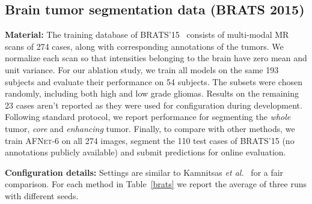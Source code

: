 \documentclass{llncs}
\newcommand{\afn}{\textsc{AFNet}}
\begin{document}
\vspace{-3mm}
\subsection{Brain tumor segmentation data (BRATS 2015) }
\label{subsec:brats_data}
\vspace{-1mm}
\textbf{Material:} The training database of BRATS'15~\cite{menze2015multimodal} consists of multi-modal MR scans of 274 cases, along with corresponding annotations of the tumors. We normalize each scan so that intensities belonging to the brain have zero mean and unit variance. For our ablation study, we train all models on the same 193 subjects and evaluate their performance on 54 subjects. The subsets were chosen randomly, including both high and low grade gliomas. Results on the remaining 23 cases aren't reported as they were used for configuration during development. Following standard protocol, we report performance for segmenting the \emph{whole} tumor, \emph{core} and \emph{enhancing} tumor. Finally, to compare with other methods, we train \afn-6 on all 274 images, segment the 110 test cases of BRATS'15 (no annotations publicly available) and submit predictions for online evaluation.

\textbf{Configuration details:} Settings are similar to Kamnitsas \emph{et al.}~\cite{Kamnitsas2017EfficientM3} for a fair comparison. For each method in Table~\ref{brats} we report the average of three runs with different seeds.
\end{document}
